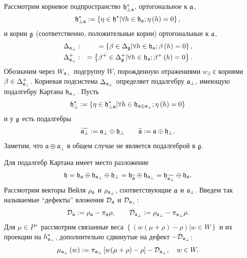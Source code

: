 \documentclass[12pt]{article}
\theoremstyle{definition}
\begin{document}
Рассмотрим корневое подпространство  $\frak{h}_{\perp \frak{a}}^{\ast }$, ортогональное к $\frak{a}$,
\begin{equation*}
\frak{h}_{\perp \frak{a}}^{\ast }:=\left\{ \eta \in \frak{h}^{\ast }|\forall
h\in \frak{h}_{\frak{a}};\eta \left( h\right) =0\right\} ,
\end{equation*}
и корни  $\frak{g}$ (соответственно, положительные корни)  ортогональные к $\frak{a}$,
\begin{eqnarray}
\Delta _{\frak{a}_{\perp }} &:&=\left\{ \beta \in \Delta _{\frak{g}}|\forall
h\in \frak{h}_{\frak{a}};\beta \left( h\right) =0\right\} ,
\label{delta a ort} \\
\Delta _{\frak{a}_{\perp }}^{+} &:&=\left\{ \beta ^{+}\in \Delta _{\frak{g}%
}^{+}|\forall h\in \frak{h}_{\frak{a}};\beta ^{+}\left( h\right) =0\right\} .
\notag
\end{eqnarray}
Обозначим через  $W_{\frak{a}_{\perp }}$ подгруппу  $W$, порожденную отражениями  $w_{\beta }$ с корнями  $\beta \in \Delta_{\frak{a}_{\perp}}^{+}$. Корневая подсистема  $\Delta _{\frak{a}_{\perp }}$ определяет подалгебру  $\frak{a}_{\perp }$, имеющую подалгебру Картана $\frak{h}_{\frak{a}_{\perp }}$. Пусть
\begin{equation*}
\frak{h}_{\perp }^{\ast }:=\left\{ \eta \in \frak{h}_{\perp \frak{a}}^{\ast
}|\forall h\in \frak{h}_{\frak{a}\oplus \frak{a}_{\perp }};\eta \left(
h\right) =0\right\}
\end{equation*}
и у  $\frak{g}$ есть подалгебры
\begin{eqnarray}
\widetilde{\frak{a}_{\perp }} :=\frak{a}_{\perp }\oplus \frak{h}_{\perp }
\qquad
\widetilde{\frak{a}} :=\frak{a}\oplus \frak{h}_{\perp }.
\end{eqnarray}
Заметим, что  $\mathfrak{a} \oplus \mathfrak{a}_{\bot}$ в общем случае не является подалгеброй в $\mathfrak{g}$.

Для подалгебр Картана имеет место разложение
\begin{equation}
\frak{h}=\frak{\frak{h}_{\frak{a}}}\oplus \frak{h}_{\frak{a}_{\perp }}\oplus
\frak{h}_{\perp }=\frak{\frak{h}_{\widetilde{\frak{a}}}}\oplus \frak{h}_{%
\frak{a}_{\perp }}=\frak{\frak{h}_{\widetilde{\frak{a}_{\perp }}}}\oplus
\frak{h}_{\frak{a}}.
\end{equation}
Рассмотрим векторы Вейля  $\rho _{\frak{a}}$ и $\rho _{\frak{a}_{\perp}} $, соответствующие  $\frak{a}$ и $\frak{a}_{\perp }$.
Введем так называемые ``дефекты'' вложения  $\mathcal{D}_{\frak{a}}$ и $\mathcal{D}_{\frak{a}_{\perp }}$:
\begin{equation}
\mathcal{D}_{\frak{a}}:=\rho _{\frak{a}}-\pi _{\frak{a}}\rho , \qquad
\mathcal{D}_{\frak{a}_{\perp }}:=\rho _{\frak{a}_{\perp }}-\pi _{\frak{a}%
_{\perp }}\rho .  \label{defect ort}
\end{equation}
Для  $\mu \in P^{+}$ рассмотрим связанные веса  $\left\{\left( w(\mu +\rho )-\rho \right) |w\in W\right\} $ и их проекции на $h_{\frak{a}_{\perp }}^{\ast }$, дополнительно сдвинутые на дефект $-\mathcal{D}_{\frak{a}_{\perp }}$:
\begin{equation*}
\mu _{\frak{a}_{\perp }}\left( w\right) :=\pi _{\frak{a}_{\perp }}\left[
w(\mu +\rho )-\rho \right] -\mathcal{D}_{\frak{a}_{\perp }},\quad w\in W.
\end{equation*}
\end{document}

